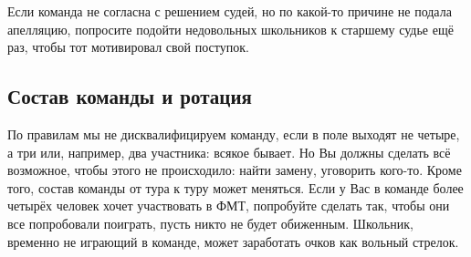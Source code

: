 \documentclass[12pt]{article}
\begin{document}
Если команда не согласна с решением судей, но по какой-то причине не подала апелляцию, попросите подойти недовольных школьников к старшему судье ещё раз, чтобы тот мотивировал свой поступок.

\subsection*{Состав команды и ротация}
По правилам мы не дисквалифицируем команду, если в поле выходят не четыре, а три или, например, два участника: всякое бывает. Но Вы должны сделать всё возможное, чтобы этого не происходило: найти замену, уговорить кого-то. Кроме того, состав команды от тура к туру может меняться. Если у Вас в команде более четырёх человек хочет участвовать в ФМТ, попробуйте сделать так, чтобы они все попробовали поиграть, пусть никто не будет обиженным. Школьник, временно не играющий в команде, может заработать очков как вольный стрелок.
\end{document}
